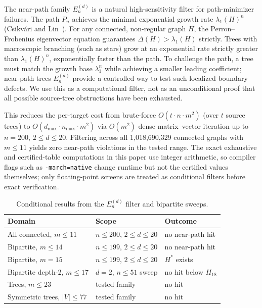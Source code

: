 \begin{remark}
  \label{rem:filter}
  The near-path family $E_n^{(d)}$ is a natural high-sensitivity filter for
  path-minimizer failures.
  The path $P_n$ achieves the minimal exponential growth rate
  $\lambda_1(H)^n$ (Csikv\'ari and Lin~\cite{csikvari2015}). For any
  connected, non-regular graph $H$, the Perron--Frobenius eigenvector equation guarantees
  $\Delta(H) > \lambda_1(H)$ strictly. Trees with macroscopic branching
  (such as stars) grow at an exponential rate strictly greater than $\lambda_1(H)^n$,
  exponentially faster than the path.
  To challenge the path, a tree must match the growth base $\lambda_1^n$
  while achieving a smaller leading coefficient; near-path trees
  $E_n^{(d)}$ provide a controlled way to test such localized boundary
  defects. We use this as a computational filter, not as an unconditional
  proof that all possible source-tree obstructions have been exhausted.
\end{remark}

This reduces the per-target cost from brute-force $O(t \cdot n \cdot m^2)$
(over $t$ source trees) to $O(d_{\max} \cdot n_{\max} \cdot m^2)$ via
$O(m^2)$ dense matrix--vector iteration up to $n = 200$, $2 \le d \le 20$.
Filtering across all 1,018,690,329 connected graphs with $m \le 11$
yields zero near-path violations in the tested range.
The exact exhaustive and certified-table computations in this paper use
integer arithmetic, so compiler flags such as \texttt{-march=native}
change runtime but not the certified values themselves; only
floating-point screens are treated as conditional filters before exact
verification.

\begin{table}[H]
\centering
\caption{Conditional results from the $E_n^{(d)}$ filter and bipartite sweeps.}
\label{tab:conditional}
\begin{tabular}{@{}lll@{}}
  \toprule
  Domain & Scope & Outcome \\
  \midrule
  All connected, $m \le 11$ & $n \le 200$, $2 \le d \le 20$ & no near-path hit \\
  Bipartite, $m \le 14$ & $n \le 199$, $2 \le d \le 20$ & no near-path hit \\
  Bipartite, $m = 15$ & $n \le 199$, $2 \le d \le 20$ & $H^*$ exists \\
  Bipartite depth-2, $m \le 17$ & $d=2$, $n \le 51$ sweep & no hit below $H_{18}$ \\
  Trees, $m \le 23$ & tested family & no hit \\
  Symmetric trees, $|V| \le 77$ & tested family & no hit \\
  \bottomrule
\end{tabular}
\end{table}

